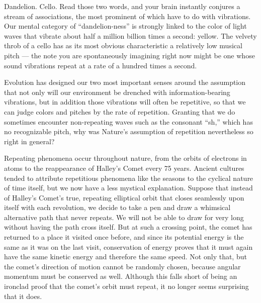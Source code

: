 Dandelion. Cello. Read those two words, and your brain
instantly conjures a stream of associations, the most
prominent of which have to do with vibrations. Our mental
category of ``dandelion-ness'' is strongly linked to the
color of light waves that vibrate about half a million
billion times a second: yellow. The velvety throb of a cello
has as its most obvious characteristic a relatively low
musical pitch --- the note you are spontaneously imagining
right now might be one whose sound vibrations repeat at a
rate of a hundred times a second.

Evolution has designed our two most important senses around
the assumption that not only will our environment be
drenched with information-bearing vibrations, but in
addition those vibrations will often be repetitive, so that
we can judge colors and pitches by the rate of repetition.
Granting that we do sometimes encounter non-repeating waves
such as the consonant ``sh,'' which has no recognizable
pitch, why was Nature's assumption of
repetition nevertheless so right in general?

Repeating phenomena occur throughout nature, from the orbits
of electrons in atoms to the reappearance of Halley's
Comet every 75 years.
Ancient cultures tended to attribute repetitious phenomena
like the seasons to the cyclical nature of time itself, but
we now have a less mystical explanation. Suppose that
instead of Halley's Comet's true, repeating elliptical orbit
that closes seamlessly upon itself with each revolution, we
decide to take a pen and draw a whimsical alternative path
that never repeats. We will not be able to draw for very
long without having the path cross itself. But at such a
crossing point, the comet has returned to a place it visited
once before, and since its potential energy is the same as
it was on the last visit, conservation of energy proves that
it must again have the same kinetic energy and therefore the
same speed. Not only that, but the comet's direction of
motion cannot be randomly chosen, because angular momentum
must be conserved as well. Although this falls short of
being an ironclad proof that the comet's orbit must repeat,
it no longer seems surprising that it does.

